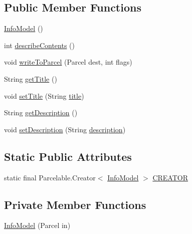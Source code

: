 \subsection*{Public Member Functions}
\begin{DoxyCompactItemize}
\item 
\hyperlink{classorg_1_1buildmlearn_1_1toolkit_1_1infotemplate_1_1data_1_1InfoModel_ada5c0847e2335624f4cfc9253e21b064}{Info\+Model} ()
\item 
int \hyperlink{classorg_1_1buildmlearn_1_1toolkit_1_1infotemplate_1_1data_1_1InfoModel_ad74a8930a975656f0b3d7d76f2d1d80a}{describe\+Contents} ()
\item 
void \hyperlink{classorg_1_1buildmlearn_1_1toolkit_1_1infotemplate_1_1data_1_1InfoModel_af6dce821d5418eb4924e327c4c203dfe}{write\+To\+Parcel} (Parcel dest, int flags)
\item 
String \hyperlink{classorg_1_1buildmlearn_1_1toolkit_1_1infotemplate_1_1data_1_1InfoModel_a18c8cffccdd231861c9d7ce8416351be}{get\+Title} ()
\item 
void \hyperlink{classorg_1_1buildmlearn_1_1toolkit_1_1infotemplate_1_1data_1_1InfoModel_a675be5ccffdf7415353b82f1cadecd94}{set\+Title} (String \hyperlink{classorg_1_1buildmlearn_1_1toolkit_1_1infotemplate_1_1data_1_1InfoModel_a974c9d7d4f0db00c57d5a2c38040fa27}{title})
\item 
String \hyperlink{classorg_1_1buildmlearn_1_1toolkit_1_1infotemplate_1_1data_1_1InfoModel_a278bbfee5211b4f35590a04d4a89e728}{get\+Description} ()
\item 
void \hyperlink{classorg_1_1buildmlearn_1_1toolkit_1_1infotemplate_1_1data_1_1InfoModel_a750081c84ecf36e35df19229da32681c}{set\+Description} (String \hyperlink{classorg_1_1buildmlearn_1_1toolkit_1_1infotemplate_1_1data_1_1InfoModel_af89990104f985165d5bd428137c76ea0}{description})
\end{DoxyCompactItemize}
\subsection*{Static Public Attributes}
\begin{DoxyCompactItemize}
\item 
static final Parcelable.\+Creator$<$ \hyperlink{classorg_1_1buildmlearn_1_1toolkit_1_1infotemplate_1_1data_1_1InfoModel}{Info\+Model} $>$ \hyperlink{classorg_1_1buildmlearn_1_1toolkit_1_1infotemplate_1_1data_1_1InfoModel_abcf0c8ceb2e2c7f7071cf9ef5a73a134}{C\+R\+E\+A\+T\+OR}
\end{DoxyCompactItemize}
\subsection*{Private Member Functions}
\begin{DoxyCompactItemize}
\item 
\hyperlink{classorg_1_1buildmlearn_1_1toolkit_1_1infotemplate_1_1data_1_1InfoModel_a1b10396c8db8d5c75dfe79258568db44}{Info\+Model} (Parcel in)
\end{DoxyCompactItemize}
